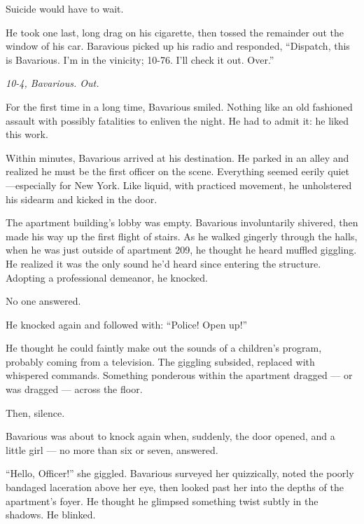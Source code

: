 Suicide would have to wait.



He took one last, long drag on his cigarette, then tossed the
remainder out the window of his car. Baravious picked up his radio
and responded, ``Dispatch, this is Bavarious. I'm in the vinicity;
10-76. I'll check it out. Over.''



{\em 10-4, Bavarious. Out.}



For the first time in a long time, Bavarious smiled. Nothing like
an old fashioned assault with possibly fatalities to enliven the
night. He had to admit it: he liked this work.



Within minutes, Bavarious arrived at his destination. He parked in
an alley and realized he must be the first officer on the scene.
Everything seemed eerily quiet---especially for New York. Like
liquid, with practiced movement, he unholstered his sidearm and
kicked in the door.



The apartment building's lobby was empty. Bavarious involuntarily
shivered, then made his way up the first flight of stairs. As he
walked gingerly through the halls, when he was just outside of
apartment 209, he thought he heard muffled giggling. He realized it
was the only sound he'd heard since entering the structure.
Adopting a professional demeanor, he knocked.



No one answered.



He knocked again and followed with: ``Police! Open up!''



He thought he could faintly make out the sounds of a children's
program, probably coming from a television. The giggling subsided,
replaced with whispered commands. Something ponderous within the
apartment dragged --- or was dragged --- across the
floor.



Then, silence.



Bavarious was about to knock again when, suddenly, the door opened,
and a little girl --- no more than six or seven, answered.



``Hello, Officer!'' she giggled. Bavarious surveyed her quizzically,
noted the poorly bandaged laceration above her eye, then looked
past her into the depths of the apartment's foyer. He thought he
glimpsed something twist subtly in the shadows. He blinked.




